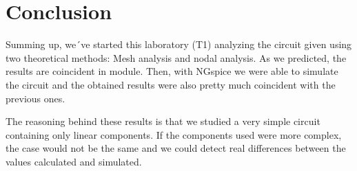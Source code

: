 \section{Conclusion}
\label{sec:conclusion}

Summing up, we´ve started this laboratory (T1) analyzing the circuit given using two theoretical methods: Mesh analysis and nodal analysis. As we predicted, the results are coincident in module. Then, with NGspice we were able to simulate the circuit and the obtained results were also pretty much coincident with the previous ones. \par
The reasoning behind these results is that we studied a very simple circuit containing only linear components. If the components used were more complex, the case would not be the same and we could detect real differences between the values calculated and simulated.
